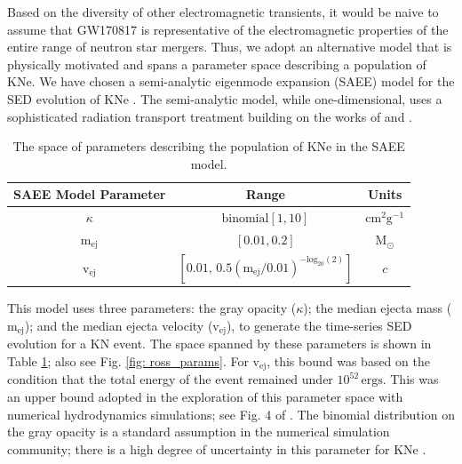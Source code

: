 Based on the diversity of other electromagnetic transients, it would be naive to assume that GW170817 is representative of the electromagnetic properties of the entire range of neutron star mergers. Thus, we adopt an alternative model that is physically motivated and spans a parameter space describing a population of KNe. We have chosen a semi-analytic eigenmode expansion (SAEE) model for the SED evolution of KNe \citep{Rosswog2018}. The semi-analytic model, while one-dimensional, uses a sophisticated radiation transport treatment building on the works of \citet{Wollaeger2017} and \citet{Pinto2000}.
\begin{table}[h!]
  \centering
  \begin{tabular}{c|c|c}
    SAEE Model Parameter & Range & Units \\
    \hline
    $\kappa$ & $\mathrm{binomial}[1, 10]$ & $\mathrm{cm^2 g^{-1}}$ \\
    \hline
    $\mathrm{m_{ej}}$ & $[0.01, 0.2]$ & $\mathrm{M_{\odot}}$ \\
    \hline
    $\mathrm{v_{ej}}$ & $[0.01, \, 0.5 (\mathrm{m_{ej}}/0.01)^{-\mathrm{log}_{20}(2)}]$ & $c$
  \end{tabular}
  \caption{The space of parameters describing the population of KNe in the SAEE model.}
  \label{tab: ross_params}
\end{table}

This model uses three parameters: the gray opacity ($\kappa$); the median ejecta mass ($\mathrm{m_{ej}}$); and the median ejecta velocity ($\mathrm{v_{ej}}$), to generate the time-series SED evolution for a KN event. The space spanned by these parameters is shown in Table \ref{tab: ross_params}; also see Fig. \ref{fig: ross_params}. For $\mathrm{v_{ej}}$, this bound was based on the condition that the total energy of the event remained under $10^{52}\, \mathrm{ergs}$. This was an upper bound adopted in the exploration of this parameter space with numerical hydrodynamics simulations; see Fig. 4 of \citet{Rosswog2016a}. The binomial distribution on the gray opacity is a standard assumption in the numerical simulation community; there is a high degree of uncertainty in this parameter for KNe \citep{Rosswog2018, Kasen2013}.

